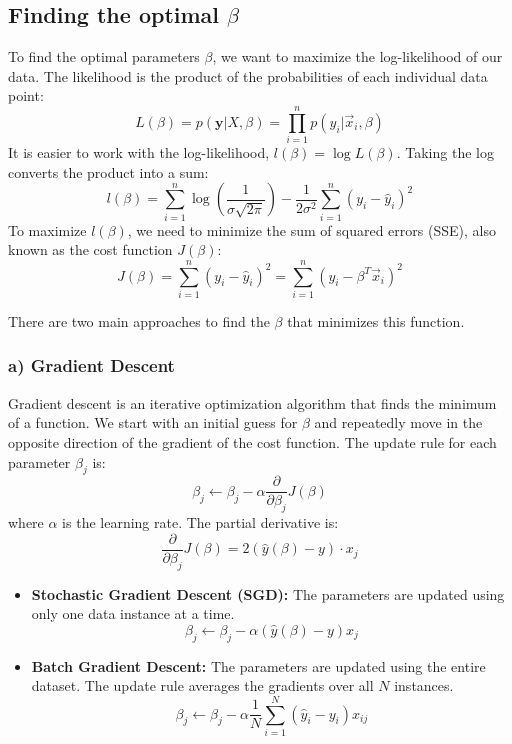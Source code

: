 \documentclass{article}
\begin{document}
\begin{multicols}{2}
\subsection{Finding the optimal $\beta$}
To find the optimal parameters $\beta$, we want to maximize the log-likelihood of our data. The likelihood is the product of the probabilities of each individual data point:
$$ L(\beta) = p(\mathbf{y}|X, \beta) = \prod_{i=1}^{n} p(y_i | \vec{x}_i, \beta) $$
It is easier to work with the log-likelihood, $l(\beta) = \log L(\beta)$. Taking the log converts the product into a sum:
$$ l(\beta) = \sum_{i=1}^{n} \log\left(\frac{1}{\sigma\sqrt{2\pi}}\right) - \frac{1}{2\sigma^2} \sum_{i=1}^{n} (y_i - \hat{y}_i)^2 $$
To maximize $l(\beta)$, we need to minimize the sum of squared errors (SSE), also known as the cost function $J(\beta)$:
$$ J(\beta) = \sum_{i=1}^{n} (y_i - \hat{y}_i)^2 = \sum_{i=1}^{n} (y_i - \beta^T \vec{x}_i)^2 $$

There are two main approaches to find the $\beta$ that minimizes this function.

\subsubsection{a) Gradient Descent}
Gradient descent is an iterative optimization algorithm that finds the minimum of a function. We start with an initial guess for $\beta$ and repeatedly move in the opposite direction of the gradient of the cost function. The update rule for each parameter $\beta_j$ is:
$$ \beta_j \leftarrow \beta_j - \alpha \frac{\partial}{\partial \beta_j} J(\beta) $$
where $\alpha$ is the learning rate. The partial derivative is:
$$ \frac{\partial}{\partial \beta_j} J(\beta) = 2(\hat{y}(\beta) - y) \cdot x_j $$
\begin{itemize}
    \item \textbf{Stochastic Gradient Descent (SGD):} The parameters are updated using only one data instance at a time.
    $$ \beta_j \leftarrow \beta_j - \alpha (\hat{y}(\beta) - y) x_j $$
    \item \textbf{Batch Gradient Descent:} The parameters are updated using the entire dataset. The update rule averages the gradients over all $N$ instances.
    $$ \beta_j \leftarrow \beta_j - \alpha \frac{1}{N} \sum_{i=1}^{N} (\hat{y}_i - y_i) x_{ij} $$
\end{itemize}


\end{multicols}
\end{document}
